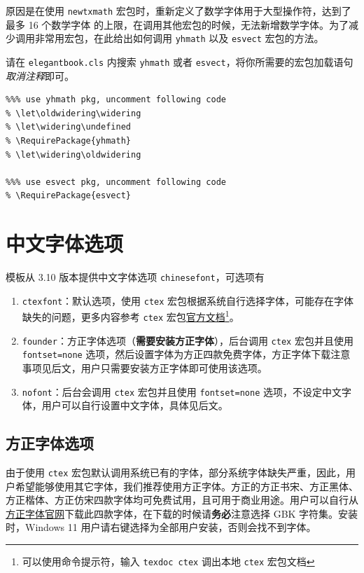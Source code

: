 \documentclass[lang=cn,newtx,10pt,scheme=chinese]{elegantbook}
\begin{document}
原因是在使用 \lstinline{newtxmath} 宏包时，重新定义了数学字体用于大型操作符，达到了 {\heiti 最多 16 个数学字体} 的上限，在调用其他宏包的时候，无法新增数学字体。为了减少调用非常用宏包，在此给出如何调用 \lstinline{yhmath} 以及 \lstinline{esvect} 宏包的方法。

请在 \lstinline{elegantbook.cls} 内搜索 \lstinline{yhmath} 或者 \lstinline{esvect}，将你所需要的宏包加载语句\textit{取消注释}即可。
\begin{lstlisting}
%%% use yhmath pkg, uncomment following code
% \let\oldwidering\widering
% \let\widering\undefined
% \RequirePackage{yhmath}
% \let\widering\oldwidering

%%% use esvect pkg, uncomment following code
% \RequirePackage{esvect}
\end{lstlisting}

\section{中文字体选项}
模板从 3.10 版本提供中文字体选项 \lstinline{chinesefont}，可选项有
\begin{enumerate}
\item \lstinline{ctexfont}：默认选项，使用 \lstinline{ctex} 宏包根据系统自行选择字体，可能存在字体缺失的问题，更多内容参考 \lstinline{ctex} 宏包\href{https://ctan.org/pkg/ctex}{官方文档}\footnote{可以使用命令提示符，输入 \lstinline{texdoc ctex} 调出本地 \lstinline{ctex} 宏包文档}。
\item \lstinline{founder}：方正字体选项（\textbf{需要安装方正字体}），后台调用 \lstinline{ctex} 宏包并且使用 \lstinline{fontset=none} 选项，然后设置字体为方正四款免费字体，方正字体下载注意事项见后文，用户只需要安装方正字体即可使用该选项。
\item \lstinline{nofont}：后台会调用 \lstinline{ctex} 宏包并且使用 \lstinline{fontset=none} 选项，不设定中文字体，用户可以自行设置中文字体，具体见后文。
\end{enumerate}

\subsection{方正字体选项}
由于使用 \lstinline{ctex} 宏包默认调用系统已有的字体，部分系统字体缺失严重，因此，用户希望能够使用其它字体，我们推荐使用方正字体。方正的{\songti 方正书宋}、{\heiti 方正黑体}、{\kaishu 方正楷体}、{\fangsong 方正仿宋}四款字体均可免费试用，且可用于商业用途。用户可以自行从\href{http://www.foundertype.com/}{方正字体官网}下载此四款字体，在下载的时候请\textbf{务必}注意选择 GBK 字符集。安装时，{\kaishu Windows 11 用户请右键选择为全部用户安装，否则会找不到字体。}
\end{document}
